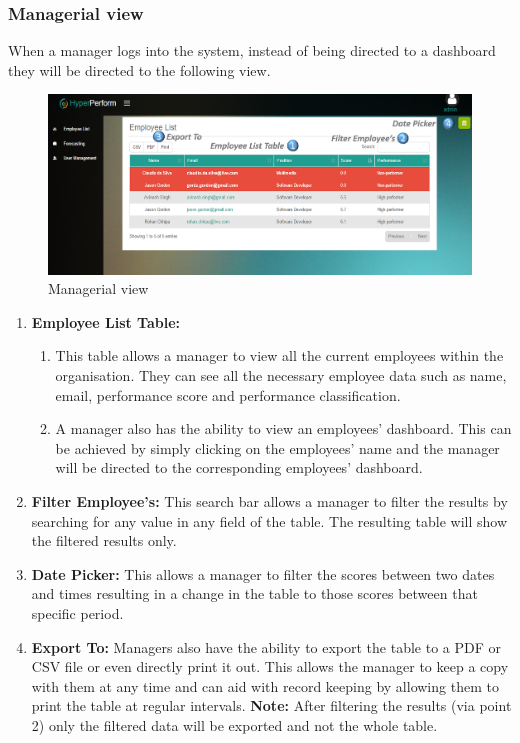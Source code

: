 \documentclass[11pt,a4paper]{article}
\begin{document}
\subsubsection{Managerial view}
When a manager logs into the system, instead of being directed to a dashboard they will be directed to the following view.

\begin{figure}[H]
	\begin{center}
		\includegraphics[width=\linewidth]{../Images/Getting_Started/Man_page_numbered}
		\caption{Managerial view}
	\end{center}
\end{figure}

\begin{enumerate}
	\item \textbf{Employee List Table:} 
	\begin{enumerate}
		\item This table allows a manager to view all the current employees within the organisation. They can see all the necessary employee data such as name, email, performance score and performance classification.
		\item A manager also has the ability to view an employees' dashboard. This can be achieved by simply clicking on the employees' name and the manager will be directed to the corresponding employees' dashboard.
	\end{enumerate}
	\item \textbf{Filter Employee's:} This search bar allows a manager to filter the results by searching for any value in any field of the table. The resulting table will show the filtered results only. 
	\item \textbf{Date Picker:} This allows a manager to filter the scores between two dates and times resulting in a change in the table to those scores between that specific period. 
	\item \textbf{Export To:} Managers also have the ability to export the table to a PDF or CSV file or even directly print it out. This allows the manager to keep a copy with them at any time and can aid with record keeping by allowing them to print the table at regular intervals. \textbf{Note:} After filtering the results (via point 2) only the filtered data will be exported and not the whole table. 
\end{enumerate}
\end{document}
